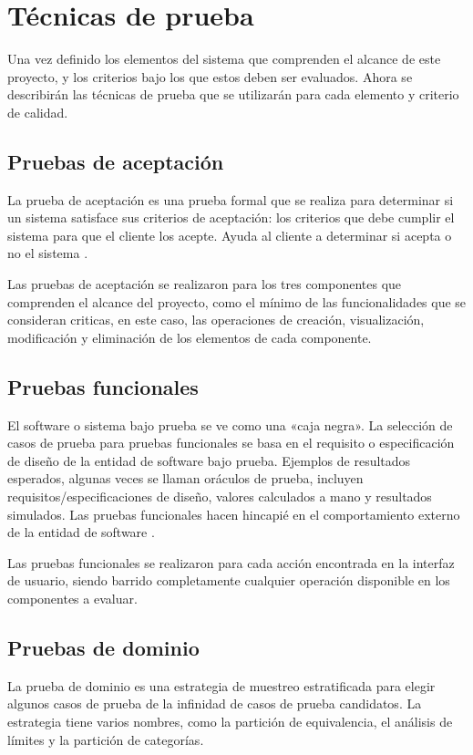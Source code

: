 \section{Técnicas de prueba}
Una vez definido los elementos del sistema que comprenden el alcance de este
proyecto, y los criterios bajo los que estos deben ser evaluados. Ahora se
describirán las técnicas de prueba que se utilizarán para cada elemento y
criterio de calidad.

\subsection{Pruebas de aceptación}
La prueba de aceptación es una prueba formal que se realiza para determinar si
un sistema satisface sus criterios de aceptación: los criterios que debe cumplir
el sistema para que el cliente los acepte. Ayuda al cliente a determinar si
acepta o no el sistema \cite{Naik}.

Las pruebas de aceptación se realizaron para los tres componentes que comprenden
el alcance del proyecto, como el mínimo de las funcionalidades que se consideran
criticas, en este caso, las operaciones de creación, visualización, modificación
y eliminación de los elementos de cada componente.

\subsection{Pruebas funcionales}
El software o sistema bajo prueba se ve como una «caja negra». La selección de
casos de prueba para pruebas funcionales se basa en el requisito o
especificación de diseño de la entidad de software bajo prueba. Ejemplos de
resultados esperados, algunas veces se llaman oráculos de prueba, incluyen
requisitos/especificaciones de diseño, valores calculados a mano y resultados
simulados. Las pruebas funcionales hacen hincapié en el comportamiento externo
de la entidad de software \cite{Luo}.

Las pruebas funcionales se realizaron para cada acción encontrada en la interfaz
de usuario, siendo barrido completamente cualquier operación disponible en los
componentes a evaluar.

\subsection{Pruebas de dominio}
La prueba de dominio es una estrategia de muestreo estratificada para elegir
algunos casos de prueba de la infinidad de casos de prueba candidatos. La
estrategia tiene varios nombres, como la partición de equivalencia, el análisis
de límites y la partición de categorías.

